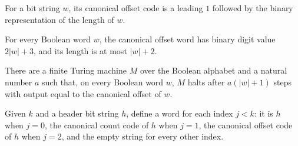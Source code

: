 \begin{definition}
\label{Turing.MachineFormat.canonOffset}
\leanok
{}
For a bit string $w$, its canonical offset code is a leading $1$ followed by the binary
representation of the length of $w$.
\end{definition}

\begin{lemma}
\label{Turing.MachineFormat.canonOffset_spec}
\leanok
{}
For every Boolean word $w$, the canonical offset word has binary digit value $2|w|+3$,
and its length is at most $|w|+2$.
\end{lemma}

\begin{lemma}
\label{Turing.MachineFormat.exists_canonOffsetTM}
\leanok
{}
There are a finite Turing machine $M$ over the Boolean alphabet and a natural number $a$
such that, on every Boolean word $w$, $M$ halts after $a(|w|+1)$ steps with output equal
to the canonical offset of $w$.
\end{lemma}

\begin{definition}
\label{Turing.MachineFormat.canonReadyWords}
\leanok
{}
Given $k$ and a header bit string $h$, define a word for each index $j<k$: it is $h$
when $j=0$, the canonical count code of $h$ when $j=1$, the canonical offset code of $h$
when $j=2$, and the empty string for every other index.
\end{definition}


